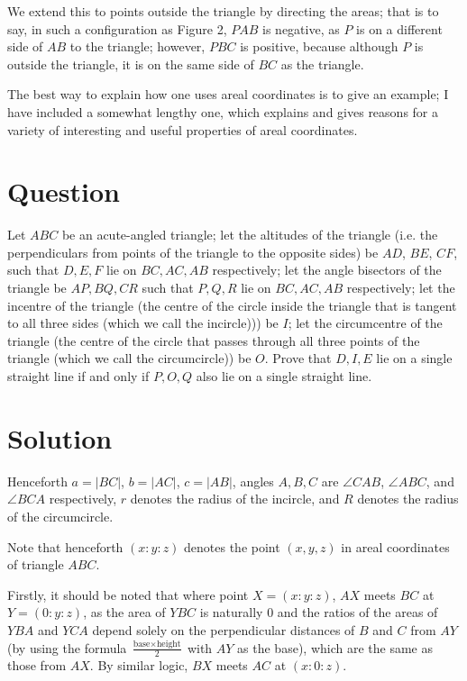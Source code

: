 \documentclass{article}
\begin{document}
We extend this to points outside the triangle by directing the areas; that is to say, in such a configuration as Figure 2, \(PAB\) is negative, as \(P\) is on a different side of \(AB\) to the triangle; however, \(PBC\) is positive, because although \(P\) is outside the triangle, it is on the same side of \(BC\) as the triangle.

The best way to explain how one uses areal coordinates is to give an example; I have included a somewhat lengthy one, which explains and gives reasons for a variety of interesting and useful properties of areal coordinates.
\section{Question}
Let \(ABC\) be an acute-angled triangle; let the altitudes of the triangle (i.e. the perpendiculars from points of the triangle to the opposite sides) be \(AD\), \(BE\), \(CF\), such that \(D, E, F\) lie on \(BC, AC, AB\) respectively; let the angle bisectors of the triangle be \(AP, BQ, CR\) such that \(P, Q, R\) lie on \(BC, AC, AB\) respectively; let the incentre of the triangle (the centre of the circle inside the triangle that is tangent to all three sides (which we call the incircle))) be \(I\); let the circumcentre of the triangle (the centre of the circle that passes through all three points of the triangle (which we call the circumcircle)) be \(O\). Prove that \(D, I, E\) lie on a single straight line if and only if \(P, O, Q\) also lie on a single straight line.
\section{Solution}
Henceforth \(a=|BC|\), \(b=|AC|\), \(c=|AB|\), angles \(A,B,C\) are \(\angle{}CAB\), \(\angle{}ABC\), and \(\angle{}BCA\) respectively, \(r\) denotes the radius of the incircle, and \(R\) denotes the radius of the circumcircle.

Note that henceforth \((x:y:z)\) denotes the point \((x,y,z)\) in areal coordinates of triangle \(ABC\).

Firstly, it should be noted that where point \(X=(x:y:z)\), \(AX\) meets \(BC\) at \(Y=(0:y:z)\), as the area of \(YBC\) is naturally 0 and the ratios of the areas of \(YBA\) and \(YCA\) depend solely on the perpendicular distances of \(B\) and \(C\) from \(AY\) (by using the formula \(\frac{\textrm{base}\times{}\textrm{height}}{2}\) with \(AY\) as the base), which are the same as those from \(AX\). By similar logic, \(BX\) meets \(AC\) at \((x:0:z)\).
\end{document}
